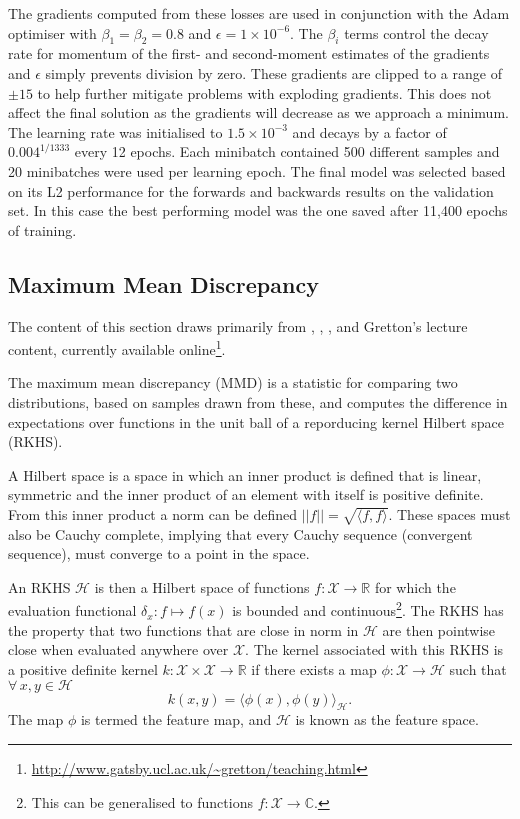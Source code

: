 The gradients computed from these losses are used in conjunction with the Adam optimiser \citep{2014Kingma} with $\beta_1=\beta_2=0.8$ and $\epsilon=1\times10^{-6}$.
The $\beta_i$ terms control the decay rate for momentum of the first- and second-moment estimates of the gradients and $\epsilon$ simply prevents division by zero.
These gradients are clipped to a range of $\pm15$ to help further mitigate problems with exploding gradients.
This does not affect the final solution as the gradients will decrease as we approach a minimum.
The learning rate was initialised to $1.5\times10^{-3}$ and decays by a factor of $0.004^{1/1333}$ every 12 epochs.
Each minibatch contained 500 different samples and 20 minibatches were used per learning epoch.
The final model was selected based on its L2 performance for the forwards and backwards results on the validation set.
In this case the best performing model was the one saved after 11,400 epochs of training.



\subsection{Maximum Mean Discrepancy}\label{Sec:Mmd}

The content of this section draws primarily from \citet{Sriperumbudur2009}, \citet{2012Gretton}, \citet{Muandet2017}, and Gretton's lecture content, currently available online\footnote{\url{http://www.gatsby.ucl.ac.uk/~gretton/teaching.html}}.

The maximum mean discrepancy (MMD) is a statistic for comparing two distributions, based on samples drawn from these, and computes the difference in expectations over functions in the unit ball of a reporducing kernel Hilbert space (RKHS).

A Hilbert space is a space in which an inner product is defined that is linear, symmetric and the inner product of an element with itself is positive definite.
From this inner product a norm can be defined $||f|| = \sqrt{\langle f, f \rangle}$.
These spaces must also be Cauchy complete, implying that every Cauchy sequence (convergent sequence), must converge to a point in the space.

An RKHS $\mathcal{H}$ is then a Hilbert space of functions $f : \mathcal{X} \rightarrow \mathbb{R}$ for which the evaluation functional $\delta_x : f \mapsto f(x)$ is bounded and continuous\footnote{This can be generalised to functions $f : \mathcal{X} \rightarrow \mathbb{C}$.}.
The RKHS has the property that two functions that are close in norm in $\mathcal{H}$ are then pointwise close when evaluated anywhere over $\mathcal{X}$.
The kernel associated with this RKHS is a positive definite kernel $k : \mathcal{X} \times \mathcal{X} \rightarrow \mathbb{R}$ if there exists a map $\phi : \mathcal{X} \rightarrow \mathcal{H}$ such that $\forall\, x,y \in \mathcal{H}$
\begin{equation}
    k(x,y) = \langle \phi(x), \phi(y) \rangle_\mathcal{H}.
\end{equation}
The map $\phi$ is termed the feature map, and $\mathcal{H}$ is known as the feature space.

